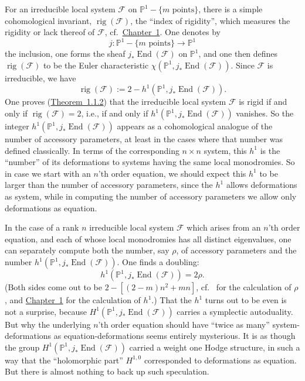 For an irreducible local system \(\mathcal{F}\) on
\(\mathbb{P}^1-\{m\text{ points}\}\), there is a simple cohomological
invariant, \(\operatorname{rig}(\mathcal{F})\), the ``index of rigidity'',
which measures the rigidity or lack thereof of \(\mathcal{F}\), cf.\
\hyperref[chap:1]{Chapter~1}. One denotes by
\[
  j:\mathbb{P}^1-\{m\text{ points}\}\longrightarrow\mathbb{P}^1
\]
the inclusion, one forms the sheaf \(j_*\operatorname{End}(\mathcal{F})\) on
\(\mathbb{P}^1\), and one then defines \(\operatorname{rig}(\mathcal{F})\)
to be the Euler characteristic
\(\chi(\mathbb{P}^1,j_*\operatorname{End}(\mathcal{F}))\). Since
\(\mathcal{F}\) is irreducible, we have
\[
  \operatorname{rig}(\mathcal{F})
  :=2-h^1(\mathbb{P}^1,j_*\operatorname{End}(\mathcal{F})).
\]
One proves (\hyperref[thm:1.1.2]{Theorem~1.1.2}) that the irreducible local system
\(\mathcal{F}\) is rigid if and only if
\(\operatorname{rig}(\mathcal{F})=2\), i.e., if and only if
\(h^1(\mathbb{P}^1,j_*\operatorname{End}(\mathcal{F}))\) vanishes. So the
integer \(h^1(\mathbb{P}^1,j_*\operatorname{End}(\mathcal{F}))\) appears as a
cohomological analogue of the number of accessory parameters, at least in
the cases where that number was defined classically. In terms of the
corresponding \(n\times n\) system, this \(h^1\) is the ``number'' of its
deformations to systems having the same local monodromies. So in case we
start with an \(n\)'th order equation, we should expect this \(h^1\) to be
larger than the number of accessory parameters, since the \(h^1\) allows
deformations as system, while in computing the number of accessory
parameters we allow only deformations as equation.

In the case of a rank \(n\) irreducible local system \(\mathcal{F}\) which
arises from an \(n\)'th order equation, and each of whose local monodromies
has all distinct eigenvalues, one can separately compute both the number,
say \(\rho\), of accessory parameters and the number
\(h^1(\mathbb{P}^1,j_*\operatorname{End}(\mathcal{F}))\). One finds a doubling:
\[
  h^1(\mathbb{P}^1,j_*\operatorname{End}(\mathcal{F}))=2\rho.
\]
(Both sides come out to be \(2-[(2-m)n^2+mn]\), cf.\
\cite[pp.\ 127--128]{Forsythe} for the calculation of \(\rho\), and
\hyperref[chap:1]{Chapter~1} for the calculation of \(h^1\).) That the
\(h^1\) turns out to be even is not a surprise, because
\(H^1(\mathbb{P}^1,j_*\operatorname{End}(\mathcal{F}))\) carries a symplectic
autoduality. But why the underlying \(n\)'th order equation should have
``twice as many'' system-deformations as equation-deformations seems
entirely mysterious. It is as though the group
\(H^1(\mathbb{P}^1,j_*\operatorname{End}(\mathcal{F}))\) carried a weight one
Hodge structure, in such a way that the ``holomorphic part''
\(H^{1,0}\) corresponded to deformations as equation. But there is almost
nothing to back up such speculation.

